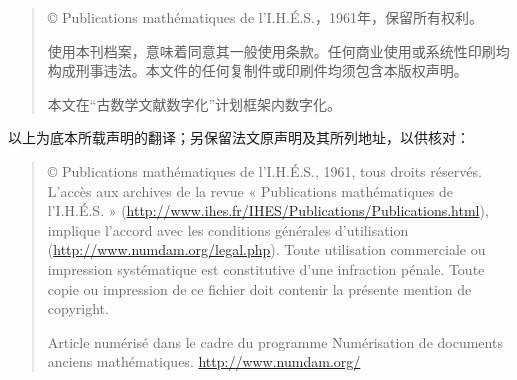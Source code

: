 \begin{quote}
© Publications mathématiques de l'I.H.É.S.，1961年，保留所有权利。

使用本刊档案，意味着同意其一般使用条款。任何商业使用或系统性印刷均构成刑事违法。本文件的任何复制件或印刷件均须包含本版权声明。

本文在“古数学文献数字化”计划框架内数字化。
\end{quote}
以上为底本所载声明的翻译；另保留法文原声明及其所列地址，以供核对：
\begin{quote}\small
© Publications mathématiques de l'I.H.É.S., 1961, tous droits réservés.
L'accès aux archives de la revue « Publications mathématiques de l'I.H.É.S. »
(\url{http://www.ihes.fr/IHES/Publications/Publications.html}), implique l'accord avec les conditions générales d'utilisation
(\url{http://www.numdam.org/legal.php}). Toute utilisation commerciale ou impression systématique est constitutive d'une infraction pénale. Toute copie ou impression de ce fichier doit contenir la présente mention de copyright.

Article numérisé dans le cadre du programme Numérisation de documents anciens mathématiques.
\url{http://www.numdam.org/}
\end{quote}\par



